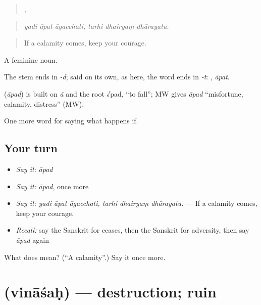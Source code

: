 \begin{quote}
  ,   
\end{quote}

\begin{quote}
\emph{yadi āpat āgacchati, tarhi dhairyaṃ dhārayatu.}
\end{quote}

\begin{quote}
If a calamity comes, keep your courage.
\end{quote}

A feminine noun.

The stem ends in \emph{-d}; said on its own, as here, the word ends in \emph{-t}: , \emph{āpat}.

\begin{cousinweb}
\textbf{} (\emph{āpad}) is built on \emph{ā} and the root √pad, \textquotedblleft{}to fall\textquotedblright{}; MW gives \emph{āpad} \textquotedblleft{}misfortune, calamity, distress\textquotedblright{} (MW).
\end{cousinweb}

\begin{grammarlens}[title={What you've built}]
One more word for saying what happens if.
\end{grammarlens}

\subsection*{Your turn}
\begin{itemize}
\raggedright
  \item \emph{Say it:} \emph{āpad}
  \item \emph{Say it:} \emph{āpad}, once more
  \item \emph{Say it:} \emph{yadi āpat āgacchati, tarhi dhairyaṃ dhārayatu.} — If a calamity comes, keep your courage.
  \item \emph{Recall:} say the Sanskrit for ceases, then the Sanskrit for adversity, then say \emph{āpad} again
\end{itemize}

\begin{tcolorbox}[breakable,colback=teal!4,colframe=teal!35!black,title={Before you move on}]
What does  mean? (\textquotedblleft{}A calamity\textquotedblright{}.) Say it once more.
\end{tcolorbox}
\section[\texorpdfstring{\sk{विनाशः} (vināśaḥ)}{विनाशः (vināśaḥ)}]{ (vināśaḥ) — destruction; ruin}

